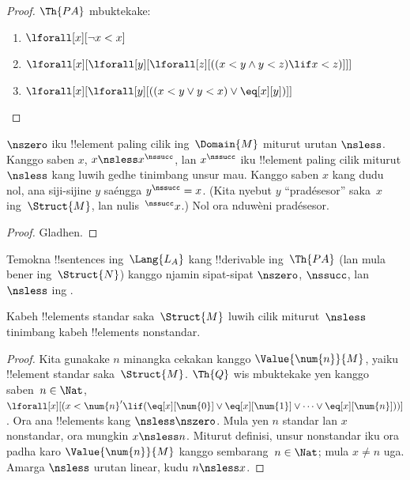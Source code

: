 \documentclass[../../../include/open-logic-section]{subfiles}
\begin{document}
\begin{proof}
$\Th{PA}$ mbuktekake:
\begin{enumerate}
\item $\lforall[x][\lnot x < x]$
\item $\lforall[x][\lforall[y][\lforall[z][((x < y \land y < z) \lif x < z)]]]$
\item $\lforall[x][\lforall[y][((x < y \lor y < x) \lor \eq[x][y])]]$
\end{enumerate}
\end{proof}

\begin{prop}
$\nszero$ iku
!!{element} paling cilik
ing~$\Domain{M}$
miturut urutan $\nsless$.
Kanggo saben $x$,
$x \nsless x^\nssucc$,
lan $x^\nssucc$
iku !!{element} paling cilik
miturut $\nsless$
kang luwih gedhe
tinimbang unsur mau.
Kanggo saben $x$
kang dudu nol,
ana siji-sijine $y$
saéngga $y^\nssucc = x$.
(Kita nyebut $y$
“pradésesor” saka~$x$
ing~$\Struct{M}$,
lan nulis~$^\nssucc x$.)
Nol ora nduwèni pradésesor.
\end{prop}

\begin{proof}
Gladhen.
\end{proof}

\begin{prob}
Temokna !!{sentence}s
ing~$\Lang{L_A}$
kang !!{derivable}
ing~$\Th{PA}$
(lan mula bener
ing~$\Struct{N}$)
kanggo njamin sipat-sipat
$\nszero$, $\nssucc$,
lan $\nsless$
ing
.
\end{prob}

\begin{prop}
Kabeh !!{element}s standar
saka~$\Struct{M}$
luwih cilik
miturut~$\nsless$
tinimbang kabeh
!!{element}s nonstandar.
\end{prop}

\begin{proof}
Kita gunakake $n$
minangka cekakan kanggo
$\Value{\num{n}}{M}$,
yaiku !!{element}
standar saka~$\Struct{M}$.
$\Th{Q}$ wis mbuktekake
yen kanggo saben~$n
\in \Nat$,
$\lforall[x][(x < \num{n}' \lif (\eq[x][\num{0}] \lor
  \eq[x][\num{1}] \lor \dots \lor \eq[x][\num{n}]))]$.
Ora ana !!{element}s
kang $\nsless \nszero$.
Mula yen $n$ standar
lan $x$ nonstandar,
ora mungkin $x \nsless n$.
Miturut definisi,
unsur nonstandar iku
ora padha karo
$\Value{\num{n}}{M}$
kanggo sembarang~$n
\in \Nat$;
mula $x \neq n$ uga.
Amarga $\nsless$
urutan linear,
kudu $n \nsless x$.
\end{proof}
\end{document}
